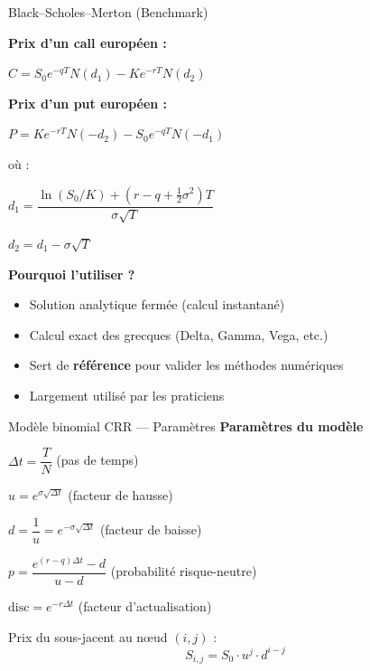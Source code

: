 \documentclass[aspectratio=169]{beamer}
\begin{document}
\begin{frame}{Black--Scholes--Merton (Benchmark)}
  \small
  
  \begin{formulabox}\scriptsize
    \textbf{Prix d'un call européen :}
    
    $C = S_0e^{-qT}N(d_1) - Ke^{-rT}N(d_2)$
    
    \vspace{2mm}
    \textbf{Prix d'un put européen :}
    
    $P = Ke^{-rT}N(-d_2) - S_0e^{-qT}N(-d_1)$
    
    \vspace{2mm}
    où :
    
    $d_1 = \dfrac{\ln(S_0/K) + (r - q + \frac{1}{2}\sigma^2)T}{\sigma\sqrt{T}}$
    
    $d_2 = d_1 - \sigma\sqrt{T}$
  \end{formulabox}
  
  \vspace{3mm}
  \textbf{Pourquoi l'utiliser ?}
  \begin{itemize}\scriptsize
    \item Solution analytique fermée (calcul instantané)
    \item Calcul exact des grecques (Delta, Gamma, Vega, etc.)
    \item Sert de \textbf{référence} pour valider les méthodes numériques
    \item Largement utilisé par les praticiens
  \end{itemize}
\end{frame}

\begin{frame}{Modèle binomial CRR — Paramètres}
  \small
  \textbf{Paramètres du modèle}
  \begin{formulabox}\scriptsize
    $\Delta t = \dfrac{T}{N}$ \quad (pas de temps)
    
    $u = e^{\sigma\sqrt{\Delta t}}$ \quad (facteur de hausse)
    
    $d = \dfrac{1}{u} = e^{-\sigma\sqrt{\Delta t}}$ \quad (facteur de baisse)
    
    $p = \dfrac{e^{(r-q)\Delta t} - d}{u - d}$ \quad (probabilité risque-neutre)
    
    $\text{disc} = e^{-r\Delta t}$ \quad (facteur d’actualisation)
    
    \vspace{1mm}
    Prix du sous-jacent au nœud $(i,j)$ :
    \[
      S_{i,j} = S_0 \cdot u^j \cdot d^{i-j}
    \]
  \end{formulabox}
\end{frame}
\end{document}

